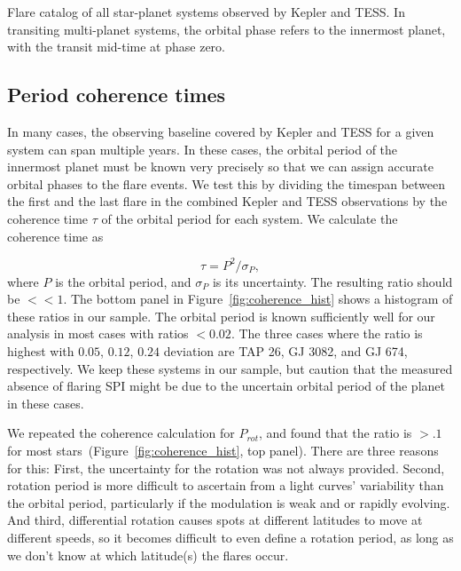 \documentclass[twocolumn]{aastex631}
\begin{document}
\begin{table*}
    \centering
            \caption{
            Flare catalog of all star-planet systems observed by Kepler and TESS. In transiting multi-planet systems, the orbital phase refers to the innermost planet, with the transit mid-time at phase zero. 
        }
    
        \label{tab:flares}
\end{table*}

\subsection{Period coherence times}
\label{sec:results:coherence}
In many cases, the observing baseline covered by Kepler and TESS for a given system can span multiple years. In these cases, the orbital period of the innermost planet must be known very precisely so that we can assign accurate orbital phases to the flare events.
We test this by dividing the timespan between the first and the last flare in the combined Kepler and TESS observations by the coherence time $\tau$ of the orbital period for each system. We calculate the coherence time as

\begin{equation}
    \tau = P^2 / \sigma_P,
\end{equation}
where $P$ is the orbital period, and $\sigma_P$ is its uncertainty.
The resulting ratio should be $<<1$. The bottom panel in Figure~\ref{fig:coherence_hist} shows a histogram of these ratios in our sample. The orbital period is known sufficiently well for our analysis in most cases with ratios $<0.02$. The three cases where the ratio is highest with $0.05$, $0.12$, $0.24$ deviation are TAP 26, GJ 3082, and GJ 674, respectively. We keep these systems in our sample, but caution that the measured absence of flaring SPI might be due to the uncertain orbital period of the planet in these cases.

We repeated the coherence calculation for $P_{rot}$, and found that the ratio is $>.1$ for most stars~(Figure~\ref{fig:coherence_hist}, top panel). There are three reasons for this: First, the uncertainty for the rotation was not always provided. Second, rotation period is more difficult to ascertain from a light curves' variability than the orbital period, particularly if the modulation is weak and or rapidly evolving. And third, differential rotation causes spots at different latitudes to move at different speeds, so it becomes difficult to even define a rotation period, as long as we don't know at which latitude(s) the flares occur.
\end{document}
